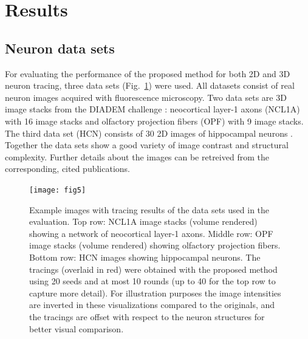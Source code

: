\section{Results}
\label{sec:results}
\subsection{Neuron data sets} 
\label{subsec:neuron-datasets}
For evaluating the performance of the proposed method for both 2D and 3D neuron tracing, three data sets (Fig.~\ref{fig5}) were used. All datasets consist of real neuron images acquired with fluorescence microscopy. Two data sets are 3D image stacks from the DIADEM challenge \cite{brown2011diadem}: neocortical layer-1 axons (NCL1A) with 16 image stacks and olfactory projection fibers (OPF) with 9 image stacks. The third data set (HCN) consists of 30 2D images of hippocampal neurons \cite{steiner2002overexpression}. Together the data sets show a good variety of image contrast and structural complexity. Further details about the images can be retreived from the corresponding, cited publications.
\begin{figure}
	\centering
	\texttt{[image: fig5]}
	\caption{Example images with tracing results of the data sets used in the evaluation. Top row: NCL1A image stacks (volume rendered) showing a network of neocortical layer-1 axons. Middle row: OPF image stacks (volume rendered) showing olfactory projection fibers. Bottom row: HCN images showing hippocampal neurons. The tracings (overlaid in red) were obtained with the proposed method using 20 seeds and at most 10 rounds (up to 40 for the top row to capture more detail). For illustration purposes the image intensities are inverted in these visualizations compared to the originals, and the tracings are offset with respect to the neuron structures for better visual comparison.}
	\label{fig5}
\end{figure}

